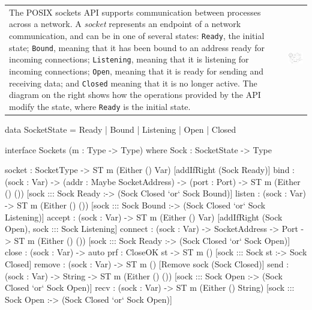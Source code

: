 \begin{tabular}{ll}
\begin{minipage}{9cm}
The POSIX sockets API supports communication between processes across
a network. A \emph{socket} represents an endpoint of a network communication,
and can be in one of several states: \texttt{Ready}, the initial state;
\texttt{Bound}, meaning that it has been bound to an address ready for incoming
connections; \texttt{Listening}, meaning that it is listening for incoming
connections; \texttt{Open}, meaning that it is ready for sending and
receiving data; and \texttt{Closed} meaning that it is no longer active.
The diagram on the right shows how the operations provided by the API
modify the state, where \texttt{Ready} is the initial state.
\end{minipage}
&
\begin{minipage}{6.5cm}
\includegraphics[width=6.5cm]{diagrams/netstate.pdf}
\end{minipage}
\end{tabular}

\small
\begin{code}[float=h, frame=single,caption={The POSIX sockets API, written
as in interface for \texttt{ST} describing how each operation affects
socket state},
label=fig:socketsiface]
data SocketState = Ready | Bound | Listening | Open | Closed

interface Sockets (m : Type -> Type) where
  Sock : SocketState -> Type

  socket : SocketType -> ST m (Either () Var) [addIfRight (Sock Ready)]
  bind : (sock : Var) -> (addr : Maybe SocketAddress) -> (port : Port) ->
    ST m (Either () ()) [sock ::: Sock Ready :-> (Sock Closed `or` Sock Bound)]
  listen : (sock : Var) ->
    ST m (Either () ()) [sock ::: Sock Bound :-> (Sock Closed `or` Sock Listening)]
  accept : (sock : Var) ->
    ST m (Either () Var) [addIfRight (Sock Open), sock ::: Sock Listening]
  connect : (sock : Var) -> SocketAddress -> Port ->
    ST m (Either () ()) [sock ::: Sock Ready :-> (Sock Closed `or` Sock Open)]
  close : (sock : Var) -> {auto prf : CloseOK st} ->
    ST m () [sock ::: Sock st :-> Sock Closed]
  remove : (sock : Var) -> ST m () [Remove sock (Sock Closed)]
  send : (sock : Var) -> String -> 
    ST m (Either () ()) [sock ::: Sock Open :-> (Sock Closed `or` Sock Open)]
  recv : (sock : Var) ->
    ST m (Either () String) [sock ::: Sock Open :-> (Sock Closed `or` Sock Open)]
\end{code}
\normalsize

